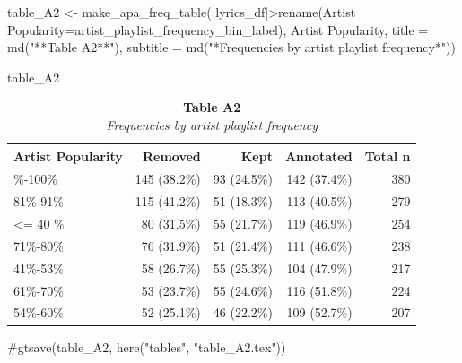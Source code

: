 \documentclass[
  man]{apa7}
\newenvironment{Shaded}{\begin{snugshade}}{\end{snugshade}}
\newcommand{\AttributeTok}[1]{\textcolor[rgb]{0.40,0.45,0.13}{#1}}
\newcommand{\CommentTok}[1]{\textcolor[rgb]{0.37,0.37,0.37}{#1}}
\newcommand{\FunctionTok}[1]{\textcolor[rgb]{0.28,0.35,0.67}{#1}}
\newcommand{\NormalTok}[1]{\textcolor[rgb]{0.00,0.23,0.31}{#1}}
\newcommand{\OtherTok}[1]{\textcolor[rgb]{0.00,0.23,0.31}{#1}}
\newcommand{\SpecialCharTok}[1]{\textcolor[rgb]{0.37,0.37,0.37}{#1}}
\newcommand{\StringTok}[1]{\textcolor[rgb]{0.13,0.47,0.30}{#1}}
\begin{document}
\begin{Shaded}
\begin{Highlighting}[]
\NormalTok{table\_A2 }\OtherTok{\textless{}{-}} \FunctionTok{make\_apa\_freq\_table}\NormalTok{(}
\NormalTok{  lyrics\_df}\SpecialCharTok{|\textgreater{}}\FunctionTok{rename}\NormalTok{(}\StringTok{\textasciigrave{}}\AttributeTok{Artist Popularity}\StringTok{\textasciigrave{}}\OtherTok{=}\NormalTok{artist\_playlist\_frequency\_bin\_label),}
  \StringTok{\textasciigrave{}}\AttributeTok{Artist Popularity}\StringTok{\textasciigrave{}}\NormalTok{,}
  \AttributeTok{title =} \FunctionTok{md}\NormalTok{(}\StringTok{"**Table A2**"}\NormalTok{),}
  \AttributeTok{subtitle =} \FunctionTok{md}\NormalTok{(}\StringTok{"*Frequencies by artist playlist frequency*"}\NormalTok{))}


\NormalTok{table\_A2}
\end{Highlighting}
\end{Shaded}

\begin{table}
\caption*{
{\large \textbf{Table A2}} \\ 
{\small \emph{Frequencies by artist playlist frequency}}
} 
\fontsize{12.0pt}{14.4pt}\selectfont
\begin{tabular*}{\linewidth}{@{\extracolsep{\fill}}lrrrr}
\toprule
{Artist Popularity} & Removed & Kept & Annotated & Total n \\ 
\midrule\addlinespace[2.5pt]
91\%-100\% & 145 (38.2\%) & 93 (24.5\%) & 142 (37.4\%) & 380 \\ 
81\%-91\% & 115 (41.2\%) & 51 (18.3\%) & 113 (40.5\%) & 279 \\ 
<= 40 \% & 80 (31.5\%) & 55 (21.7\%) & 119 (46.9\%) & 254 \\ 
71\%-80\% & 76 (31.9\%) & 51 (21.4\%) & 111 (46.6\%) & 238 \\ 
41\%-53\% & 58 (26.7\%) & 55 (25.3\%) & 104 (47.9\%) & 217 \\ 
61\%-70\% & 53 (23.7\%) & 55 (24.6\%) & 116 (51.8\%) & 224 \\ 
54\%-60\% & 52 (25.1\%) & 46 (22.2\%) & 109 (52.7\%) & 207 \\ 
\bottomrule
\end{tabular*}
\end{table}

\begin{Shaded}
\begin{Highlighting}[]
\CommentTok{\#gtsave(table\_A2, here("tables", "table\_A2.tex"))}
\end{Highlighting}
\end{Shaded}
\end{document}
